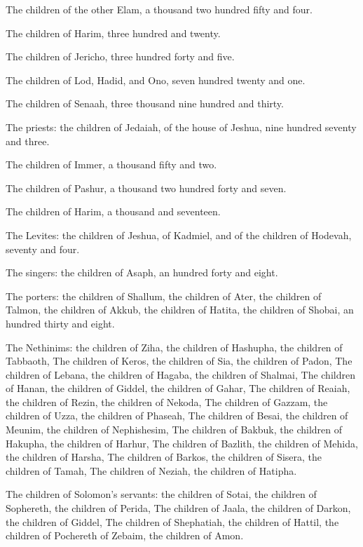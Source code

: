\Verse The children of the other Elam, a thousand two hundred fifty and four.

\Verse The children of Harim, three hundred and twenty.

\Verse The children of Jericho, three hundred forty and five.

\Verse The children of Lod, Hadid, and Ono, seven hundred twenty and one.

\Verse The children of Senaah, three thousand nine hundred and thirty.

\Verse The priests: the children of Jedaiah, of the house of Jeshua, nine hundred seventy and three.

\Verse The children of Immer, a thousand fifty and two.

\Verse The children of Pashur, a thousand two hundred forty and seven.

\Verse The children of Harim, a thousand and seventeen.

\Verse The Levites: the children of Jeshua, of Kadmiel, and of the children of Hodevah, seventy and four.

\Verse The singers: the children of Asaph, an hundred forty and eight.

\Verse The porters: the children of Shallum, the children of Ater, the children of Talmon, the children of Akkub, the children of Hatita, the children of Shobai, an hundred thirty and eight.

\Verse The Nethinims: the children of Ziha, the children of Hashupha, the children of Tabbaoth, \Verse The children of Keros, the children of Sia, the children of Padon, \Verse The children of Lebana, the children of Hagaba, the children of Shalmai, \Verse The children of Hanan, the children of Giddel, the children of Gahar, \Verse The children of Reaiah, the children of Rezin, the children of Nekoda, \Verse The children of Gazzam, the children of Uzza, the children of Phaseah, \Verse The children of Besai, the children of Meunim, the children of Nephishesim, \Verse The children of Bakbuk, the children of Hakupha, the children of Harhur, \Verse The children of Bazlith, the children of Mehida, the children of Harsha, \Verse The children of Barkos, the children of Sisera, the children of Tamah, \Verse The children of Neziah, the children of Hatipha.

\Verse The children of Solomon's servants: the children of Sotai, the children of Sophereth, the children of Perida, \Verse The children of Jaala, the children of Darkon, the children of Giddel, \Verse The children of Shephatiah, the children of Hattil, the children of Pochereth of Zebaim, the children of Amon.

